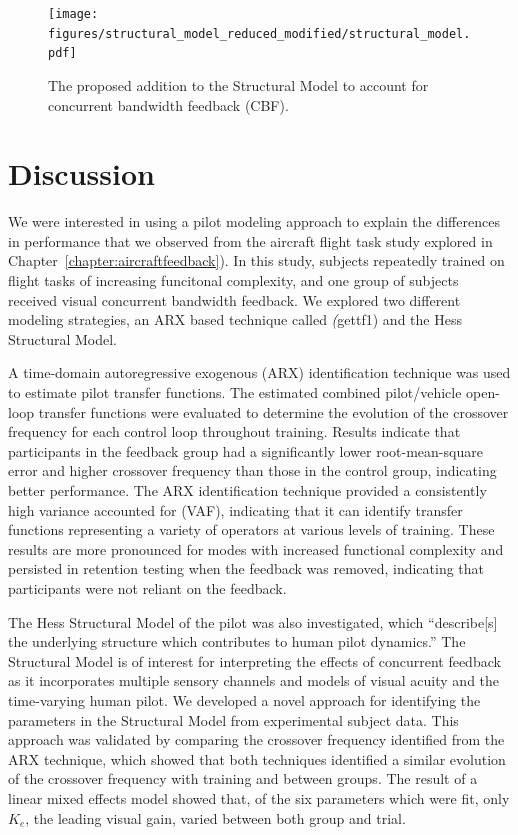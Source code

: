 \begin{figure}[tb]
    \centering
    \texttt{[image: figures/structural\_model\_reduced\_modified/structural\_model.pdf]}
    \caption[The proposed addition to the Structural Model to account for concurrent bandwidth feedback]{The proposed addition to the Structural Model to account for concurrent bandwidth feedback (CBF).}
    \label{fig:structuralmodel_feedback}
\end{figure}

\section{Discussion}
We were interested in using a pilot modeling approach to explain the differences in performance that we observed from the aircraft flight task study explored in Chapter~\ref{chapter:aircraftfeedback}).
In this study, subjects repeatedly trained on flight tasks of increasing funcitonal complexity, and one group of subjects received visual concurrent bandwidth feedback.
We explored two different modeling strategies, an ARX based technique called \textit(gettf1) and the Hess Structural Model.

A time-domain autoregressive exogenous (ARX) identification technique was used to estimate pilot transfer functions.
The estimated combined pilot/vehicle open-loop transfer functions were evaluated to determine the evolution of the crossover frequency for each control loop throughout training.
Results indicate that participants in the feedback group had a significantly lower root-mean-square error and higher crossover frequency than those in the control group, indicating better performance.
The ARX identification technique provided a consistently high variance accounted for (VAF), indicating that it can identify transfer functions representing a variety of operators at various levels of training.
These results are more pronounced for modes with increased functional complexity and persisted in retention testing when the feedback was removed, indicating that participants were not reliant on the feedback.

The Hess Structural Model of the pilot was also investigated, which ``describe[s] the underlying structure which contributes to human pilot dynamics.''
The Structural Model is of interest for interpreting the effects of concurrent feedback as it incorporates multiple sensory channels and models of visual acuity and the time-varying human pilot.
We developed a novel approach for identifying the parameters in the Structural Model from experimental subject data.
This approach was validated by comparing the crossover frequency identified from the ARX technique, which showed that both techniques identified a similar evolution of the crossover frequency with training and between groups.
The result of a linear mixed effects model showed that, of the six parameters which were fit, only $K_e$, the leading visual gain, varied between both group and trial.

